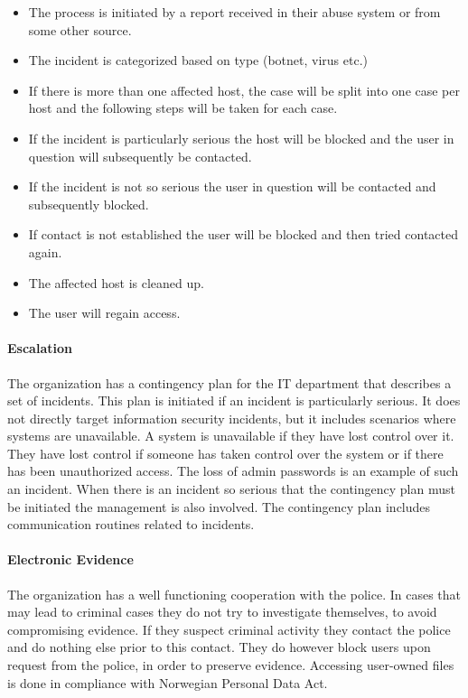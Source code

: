 \documentclass[b5paper, twoside, openright, 11pt]{report}
\begin{document}
\begin{itemize}\itemsep-0.2cm
\item The process is initiated by a report received in their abuse system or from some other source. 
\item The incident is categorized based on type (botnet, virus etc.)
\item If there is more than one affected host, the case will be split into one case per host and the following steps will be taken for each case.
\item If the incident is particularly serious the host will be blocked and the user in question will subsequently be contacted.
\item If the incident is not so serious the user in question will be contacted and subsequently blocked.
\item If contact is not established the user will be blocked and then tried contacted again.
\item The affected host is cleaned up.
\item The user will regain access.
\end{itemize}

\paragraph{Escalation}
The organization has a contingency plan for the IT department that describes a set of incidents. This plan is initiated if an incident is particularly serious. It does not directly target information security incidents, but it includes scenarios where systems are unavailable. A system is unavailable if they have lost control over it. They have lost control if someone has taken control over the system or if there has been unauthorized access. The loss of admin passwords is an example of such an incident. When there is an incident so serious that the contingency plan must be initiated the management is also involved. The contingency plan includes communication routines related to incidents. 

\paragraph{Electronic Evidence}
The organization has a well functioning cooperation with the police. In cases that may lead to criminal cases they do not try to investigate themselves, to avoid compromising evidence. If they suspect criminal activity they contact the police and do nothing else prior to this contact. They do however block users upon request from the police, in order to preserve evidence. Accessing user-owned files is done in compliance with Norwegian Personal Data Act.
\end{document}
